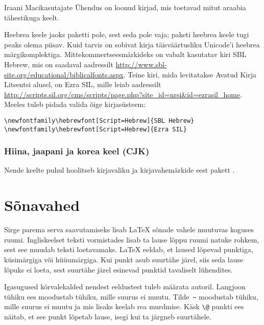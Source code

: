 Iraani Macikasutajate Ühendus on loonud kirjad, mis toetavad mitut
araabia tähestikuga keelt.

Heebrea keele jaoks paketti pole, sest seda pole
vaja; paketi  heebrea keele tugi peaks olema piisav.
Kuid tarvis on sobivat kirja täisväärtusliku Unicode'i heebrea
märgikomplektiga. Mittekommertseesmärkideks on vabalt kasutatav kiri
SBL
Hebrew, mis on saadaval aadressilt
\url{http://www.sbl-site.org/educational/biblicalfonts.aspx}. Teine
kiri, mida levitatakse Avatud Kirja Litsentsi alusel, on Ezra SIL, mille
leiab aadressilt
\url{http://scripts.sil.org/cms/scripts/page.php?site_id=nrsi&id=ezrasil_home}.
Meeles tuleb pidada valida õige kirjasüsteem:
\begin{lscommand}
\verb|\newfontfamily\hebrewfont[Script=Hebrew]{SBL Hebrew}| \\
\verb|\newfontfamily\hebrewfont[Script=Hebrew]{Ezra SIL}|
\end{lscommand}

\subsubsection{Hiina, jaapani ja korea keel (CJK)}

Nende keelte puhul hoolitseb kirjavaliku ja kirjavahemärkide eest pakett
 \cite{xecjk}.

\section{Sõnavahed}  

Sirge parema serva saavutamiseks lisab \LaTeX{} sõnade vahele muutuvas
koguses ruumi. Ingliskeelset teksti vormistades lisab ta lause lõppu
ruumi natuke rohkem, sest see muudab teksti loetavamaks. \LaTeX{}
eeldab, et laused lõpevad punktiga, küsimärgiga või hüüumärgiga. Kui
punkt asub suurtähe järel, siis seda lause lõpuks ei loeta, sest
suurtähe järel esinevad punktid tavaliselt lühendites.

Igasugused kõrvalekalded nendest eeldustest tuleb määrata autoril.
Langjoon tühiku ees moodustab tühiku, mille suurus ei muutu.
Tilde~\verb|~| moodustab tühiku, mille suurus ei muutu ja mis lisaks
keelab rea murdmise. Käsk \verb|\@| punkti ees näitab, et see punkt
lõpetab lause, isegi kui ta järgneb suurtähele.   


